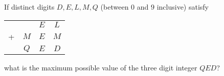 If distinct digits $D,E,L,M,Q$ (between $0$ and $9$ inclusive) satisfy
\begin{center}
    \begin{tabular}{c@{\,}c@{\,}c@{\,}c}
      &   & $E$ & $L$ \\
    + & $M$ & $E$ & $M$ \\\hline
      & $Q$ & $E$ & $D$ \\
    \end{tabular}
\end{center}
what is the maximum possible value of the three digit integer $QED$?